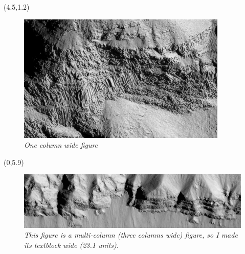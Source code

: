 \documentclass[lpsc]{lpscposter}
\begin{document}
\begin{textblock}{7}(4.5,1.2)
	\begin{center}
	\begin{figure}
	\includegraphics[width=\textwidth]{PSP_006985_2020_RED_NOMAP_crop2012_2}
		\caption{
		\scriptsize
		{\em One column wide figure}
		\label{MartianColumns}
		}
	\end{figure}
	\end{center}
\end{textblock}

\begin{textblock}{23.1}(0,5.9)
\begin{figure}
\begin{center}
\includegraphics[width=\textwidth]{PSP_006985_2020_RED_NOMAP_2172009_31759}
	\caption{
	\scriptsize
	{\em This figure is a multi-column (three columns wide) figure, so I made its textblock wide (23.1 units).}
	\label{MartianColumns2}
	}
\end{center}
\end{figure}
\end{textblock}
\end{document}
